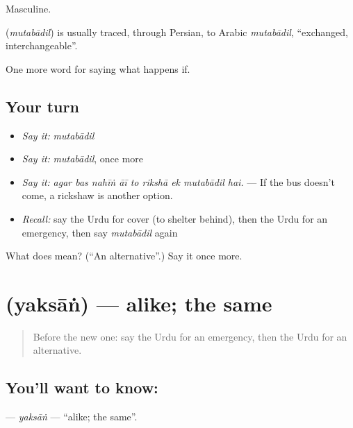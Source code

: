 Masculine.

\begin{cousinweb}
\textbf{} (\emph{mutabādil}) is usually traced, through Persian, to Arabic \emph{mutabādil}, \textquotedblleft{}exchanged, interchangeable\textquotedblright{}.
\end{cousinweb}

\begin{grammarlens}[title={What you've built}]
One more word for saying what happens if.
\end{grammarlens}

\subsection*{Your turn}
\begin{itemize}
\raggedright
  \item \emph{Say it:} \emph{mutabādil}
  \item \emph{Say it:} \emph{mutabādil}, once more
  \item \emph{Say it:} \emph{agar bas nahīṅ āī to rikshā ek mutabādil hai.} — If the bus doesn't come, a rickshaw is another option.
  \item \emph{Recall:} say the Urdu for cover (to shelter behind), then the Urdu for an emergency, then say \emph{mutabādil} again
\end{itemize}

\begin{tcolorbox}[breakable,colback=teal!4,colframe=teal!35!black,title={Before you move on}]
What does  mean? (\textquotedblleft{}An alternative\textquotedblright{}.) Say it once more.
\end{tcolorbox}
\section[\texorpdfstring{\ur{یکساں} (yaksāṅ)}{یکساں (yaksāṅ)}]{ (yaksāṅ) — alike; the same}

\label{lesson:UR-C537-yaksan}



\begin{quote}
Before the new one: say the Urdu for an emergency, then the Urdu for an alternative.
\end{quote}

\subsection*{You'll want to know: }
\textbf{} — \emph{yaksāṅ} — \textquotedblleft{}alike; the same\textquotedblright{}.

